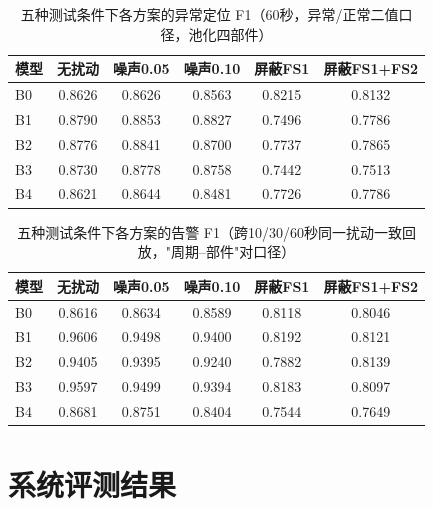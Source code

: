\documentclass[12pt, a4paper]{ctexart}
\begin{document}
\begin{table}[H]
    \centering
    \caption{五种测试条件下各方案的异常定位 F1（60秒，异常/正常二值口径，池化四部件）}
    \label{tab:robust_loc_f1}
    \small
    \begin{tabular}{lccccc}
        \toprule
        \textbf{模型} & \textbf{无扰动} & \textbf{噪声0.05} & \textbf{噪声0.10} & \textbf{屏蔽FS1} & \textbf{屏蔽FS1+FS2} \\
        \midrule
        B0 & 0.8626 & 0.8626 & 0.8563 & 0.8215 & 0.8132 \\
        B1 & 0.8790 & 0.8853 & 0.8827 & 0.7496 & 0.7786 \\
        B2 & 0.8776 & 0.8841 & 0.8700 & 0.7737 & 0.7865 \\
        B3 & 0.8730 & 0.8778 & 0.8758 & 0.7442 & 0.7513 \\
        B4 & 0.8621 & 0.8644 & 0.8481 & 0.7726 & 0.7786 \\
        \bottomrule
    \end{tabular}
\end{table}
\begin{table}[H]
    \centering
    \caption{五种测试条件下各方案的告警 F1（跨10/30/60秒同一扰动一致回放，"周期--部件"对口径）}
    \label{tab:robust_alarm_f1}
    \small
    \begin{tabular}{lccccc}
        \toprule
        \textbf{模型} & \textbf{无扰动} & \textbf{噪声0.05} & \textbf{噪声0.10} & \textbf{屏蔽FS1} & \textbf{屏蔽FS1+FS2} \\
        \midrule
        B0 & 0.8616 & 0.8634 & 0.8589 & 0.8118 & 0.8046 \\
        B1 & 0.9606 & 0.9498 & 0.9400 & 0.8192 & 0.8121 \\
        B2 & 0.9405 & 0.9395 & 0.9240 & 0.7882 & 0.8139 \\
        B3 & 0.9597 & 0.9499 & 0.9394 & 0.8183 & 0.8097 \\
        B4 & 0.8681 & 0.8751 & 0.8404 & 0.7544 & 0.7649 \\
        \bottomrule
    \end{tabular}
\end{table}
\section{系统评测结果}
\end{document}
